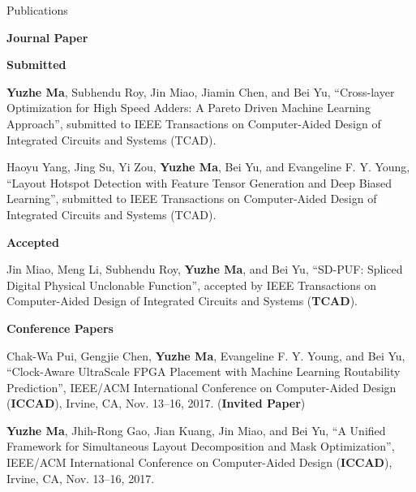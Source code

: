 \begin{rSection}{Publications}

\iffalse
\textbf{Books / Book Chapters}
\begin{description}[font=\normalfont]

\end{description}
\fi

\textbf{Journal Paper}
\begin{description}[font=\normalfont]
\item \textbf{Submitted}
\item[{[J]}]{
    \textbf{Yuzhe Ma}, Subhendu Roy, Jin Miao, Jiamin Chen, and Bei Yu,
    ``Cross-layer Optimization for High Speed Adders: A Pareto Driven Machine Learning Approach'', 
    submitted to IEEE Transactions on Computer-Aided Design of Integrated Circuits and Systems (TCAD).
}

\item[{[J]}]{
    Haoyu Yang, Jing Su, Yi Zou, \textbf{Yuzhe Ma}, Bei Yu, and Evangeline F. Y. Young, 
    ``Layout Hotspot Detection with Feature Tensor Generation and Deep Biased Learning'', 
    submitted to IEEE Transactions on Computer-Aided Design of Integrated Circuits and Systems (TCAD).
}

\item \textbf{Accepted}
\item[{[J1]}]{
	Jin Miao, Meng Li, Subhendu Roy, \textbf{Yuzhe Ma}, and Bei Yu, 
	``SD-PUF: Spliced Digital Physical Unclonable Function'', 
	accepted by IEEE Transactions on Computer-Aided Design of Integrated Circuits and Systems (\textbf{TCAD}).
}
\end{description}


\textbf{Conference Papers}
\begin{description}[font=\normalfont]
\item[{[C4]}]{
	Chak-Wa Pui, Gengjie Chen, \textbf{Yuzhe Ma}, Evangeline F. Y. Young, and Bei Yu,
	``Clock-Aware UltraScale FPGA Placement with Machine Learning Routability Prediction'', 
	IEEE/ACM International Conference on Computer-Aided Design (\textbf{ICCAD}), Irvine, CA, Nov. 13--16, 2017.
	(\textbf{Invited Paper})
}

\item[{[C3]}]{
    \textbf{Yuzhe Ma}, Jhih-Rong Gao, Jian Kuang, Jin Miao, and Bei Yu,
    ``A Unified Framework for Simultaneous Layout Decomposition and Mask Optimization'',
    IEEE/ACM International Conference on Computer-Aided Design (\textbf{ICCAD}), Irvine, CA, Nov. 13--16, 2017.
}


\end{description}
\end{rSection}
